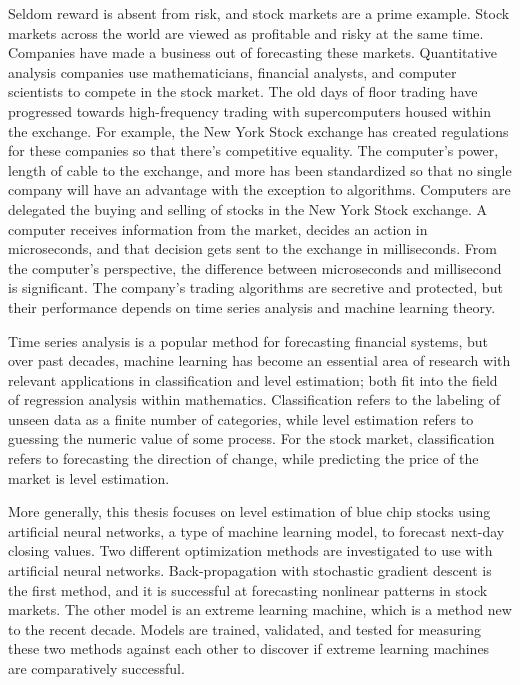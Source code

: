 \documentclass[../main.tex]{subfiles}
\begin{document}
    Seldom reward is absent from risk, and stock markets are a prime example.
    Stock markets across the world are viewed as profitable and risky at the same time.
    Companies have made a business out of forecasting these markets.
    Quantitative analysis companies use mathematicians, financial analysts, and computer scientists to compete in the stock market.
    The old days of floor trading have progressed towards high-frequency trading with supercomputers housed within the exchange.
    For example, the New York Stock exchange has created regulations for these companies so that there’s competitive equality.
    The computer’s power, length of cable to the exchange, and more has been standardized so that no single company will have an advantage with the exception to algorithms.
    Computers are delegated the buying and selling of stocks in the New York Stock exchange.
    A computer receives information from the market, decides an action in microseconds, and that decision gets sent to the exchange in milliseconds.
    From the computer’s perspective, the difference between microseconds and millisecond is significant.
    The company’s trading algorithms are secretive and protected, but their performance depends on time series analysis and machine learning theory.

    Time series analysis is a popular method for forecasting financial systems, but over past decades, machine learning has become an essential area of research with relevant applications in classification and level estimation; both fit into the field of regression analysis within mathematics.
    Classification refers to the labeling of unseen data as a finite number of categories, while level estimation refers to guessing the numeric value of some process.
    For the stock market, classification refers to forecasting the direction of change, while predicting the price of the market is level estimation.

    More generally, this thesis focuses on level estimation of blue chip stocks using artificial neural networks, a type of machine learning model, to forecast next-day closing values.
    Two different optimization methods are investigated to use with artificial neural networks.
    Back-propagation with stochastic gradient descent is the first method, and it is successful at forecasting nonlinear patterns in stock markets.
    The other model is an extreme learning machine, which is a method new to the recent decade.
    Models are trained, validated, and tested for measuring these two methods against each other to discover if extreme learning machines are comparatively successful.
\end{document}
